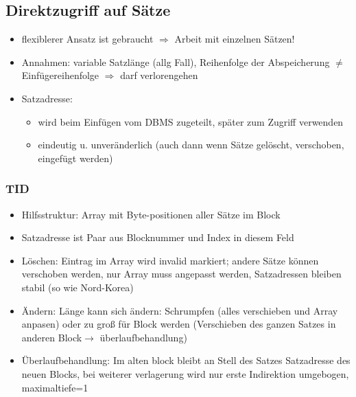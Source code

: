 \documentclass[a4paper, 12pt]{scrartcl}
\begin{document}
\subsection{Direktzugriff auf Sätze}
\begin{itemize}
	\item
		flexiblerer Ansatz ist gebraucht $\Rightarrow$ Arbeit mit einzelnen Sätzen!
	\item
		Annahmen: variable Satzlänge (allg Fall), Reihenfolge der Abspeicherung $\neq$ Einfügereihenfolge $\Rightarrow$ darf verlorengehen
	\item Satzadresse:
		\begin{itemize}
			\item
				wird beim Einfügen vom DBMS zugeteilt, später zum Zugriff verwenden
			\item
				eindeutig u. unveränderlich (auch dann wenn Sätze gelöscht, verschoben, eingefügt werden)
		\end{itemize}
\end{itemize}
\subsubsection{TID}
\begin{itemize}
	\item
		Hilfsstruktur: Array mit Byte-positionen aller Sätze im Block
	\item
		Satzadresse ist Paar aus Blocknummer und Index in diesem Feld
	\item Löschen: Eintrag im Array wird invalid markiert; andere Sätze können verschoben werden, nur Array muss angepasst werden, Satzadressen bleiben stabil (so wie Nord-Korea)
	\item Ändern: Länge kann sich ändern: Schrumpfen (alles verschieben und Array anpasen) oder zu groß für Block werden (Verschieben des ganzen Satzes in anderen Block$\rightarrow$ überlaufbehandlung)
	\item Überlaufbehandlung: Im alten block bleibt an Stell des Satzes Satzadresse des neuen Blocks, bei weiterer verlagerung wird nur erste Indirektion umgebogen, maximaltiefe=1
\end{itemize}
\end{document}
